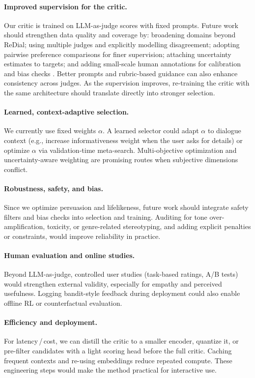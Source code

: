 \documentclass[12pt]{article}
\begin{document}
  \paragraph{Improved supervision for the critic.} Our critic is trained on LLM-as-judge scores with fixed prompts. Future work should strengthen data quality and coverage by: broadening domains beyond ReDial; using multiple judges and explicitly modelling disagreement; adopting pairwise preference comparisons for finer supervision; attaching uncertainty estimates to targets; and adding small-scale human annotations for calibration and bias checks \citep{yan2023llmjudge}. Better prompts and rubric-based guidance can also enhance consistency across judges. As the supervision improves, re-training the critic with the same architecture should translate directly into stronger selection.
  
  \paragraph{Learned, context-adaptive selection.} We currently use fixed weights $\alpha$. A learned selector could adapt $\alpha$ to dialogue context (e.g., increase informativeness weight when the user asks for details) or optimize $\alpha$ via validation-time meta-search. Multi-objective optimization and uncertainty-aware weighting are promising routes when subjective dimensions conflict.
  
  \paragraph{Robustness, safety, and bias.} Since we optimize persuasion and lifelikeness, future work should integrate safety filters and bias checks into selection and training. Auditing for tone over-amplification, toxicity, or genre-related stereotyping, and adding explicit penalties or constraints, would improve reliability in practice.
  
  \paragraph{Human evaluation and online studies.} Beyond LLM-as-judge, controlled user studies (task-based ratings, A/B tests) would strengthen external validity, especially for empathy and perceived usefulness. Logging bandit-style feedback during deployment could also enable offline RL or counterfactual evaluation.
  
  \paragraph{Efficiency and deployment.} For latency\,/\,cost, we can distill the critic to a smaller encoder, quantize it, or pre-filter candidates with a light scoring head before the full critic. Caching frequent contexts and re-using embeddings reduce repeated compute. These engineering steps would make the method practical for interactive use.
  
\end{document}
